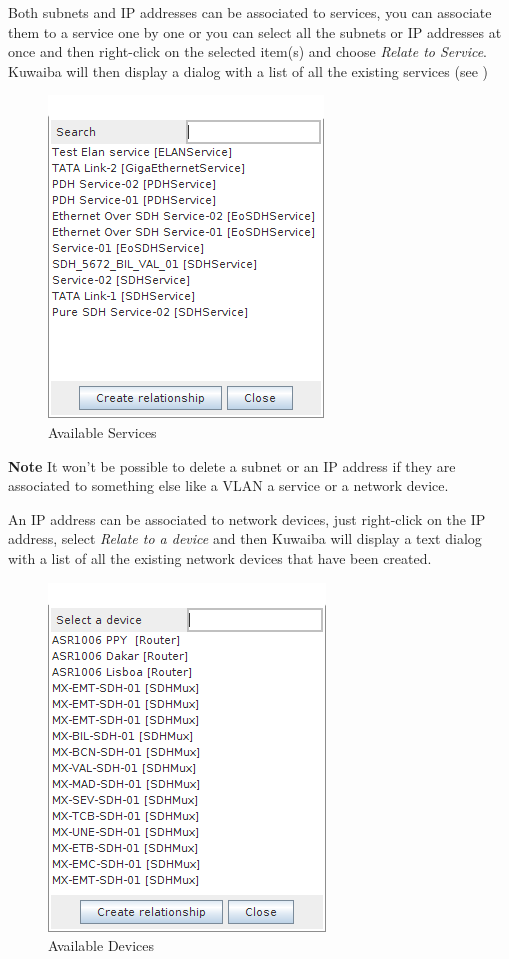 \documentclass[a4paper]{article}
\begin{document}
		Both subnets and IP addresses can be associated to services, you can associate them to a service one by one or you can select all the subnets or IP addresses at once and then right-click on the selected item(s) and choose \textit{Relate to Service}. Kuwaiba will then display a dialog with a list of all the existing services (see \textbf{})
		\begin{figure}[h!]
			\centering
			\includegraphics[width=0.4\linewidth]{img/ipam_available_services.png}
			\caption{Available Services}
			\label{fig:ipam_available_services}
		\end{figure}
		\begin{framed} {\large \textbf{Note}}
			It won't be possible to delete a subnet or an IP address if they are associated to something else like a VLAN a service or a network device.
		\end{framed}		 		 

		\newpage
		An IP address can be associated to network devices, just right-click on the IP address, select \textit{Relate to a device} and then Kuwaiba will display a text dialog with a list of all the existing network devices that have been created.
		\begin{figure}[h!]
			\centering
			\includegraphics[width=0.4\linewidth]{img/ipam_available_devices.png}
			\caption{Available Devices}
			\label{fig:ipam_available_devices}
		\end{figure}
		
\end{document}
